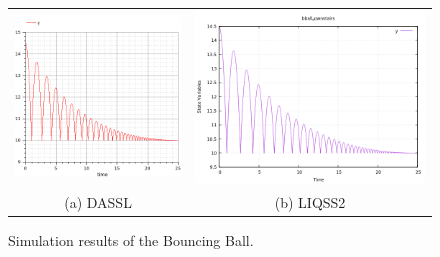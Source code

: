 \documentclass[10pt]{article}
\begin{document}
    \begin{figure}[htbp]\centering
		\begin{tabular}{cc}

   \includegraphics[scale=0.45]{./Fig/bal-om.png}&\includegraphics[scale=0.45]{./Fig/bal-liqss.png}\\(a) DASSL&(b) LIQSS2
    \end{tabular}
\vspace{-0.2cm}
\caption{Simulation results of the Bouncing Ball.}\label{Fig1}
\end{figure}

\newpage
\end{document}
